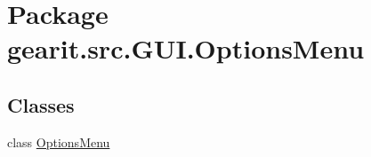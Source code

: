 \hypertarget{namespacegearit_1_1src_1_1_g_u_i_1_1_options_menu}{\section{Package gearit.\+src.\+G\+U\+I.\+Options\+Menu}
\label{namespacegearit_1_1src_1_1_g_u_i_1_1_options_menu}
}
\subsection*{Classes}
\begin{DoxyCompactItemize}
\item 
class \hyperlink{classgearit_1_1src_1_1_g_u_i_1_1_options_menu_1_1_options_menu}{Options\+Menu}
\end{DoxyCompactItemize}
